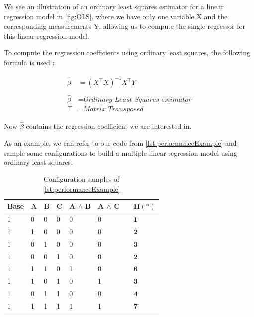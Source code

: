 We see an illustration of an ordinary least squares estimator for a linear regression model in \autoref{fig:OLS}, where we have only one variable 
X and the corresponding measurements Y, allowing us to compute the single regressor for this linear regression model.

To compute the regression coefficients using ordinary least squares, the following formula is used \cite{Linear-Regression}:

\begin{align}
    \hat{\beta} &=  (\textit{X}^{\top } \textit{X} )^{-1}\textit{X}^{\top} Y \\ \nonumber \\\nonumber
    \hat{\beta} &= \textit{Ordinary Least Squares estimator}\\\nonumber
    \top &= \textit{Matrix Transposed}\nonumber
\end{align}\label{equ:ols}

Now $\hat{\beta}$ contains the regression coefficient we are interested in.

As an example, we can refer to our code from \autoref{lst:performanceExample}
and sample some configurations to build a multiple linear regression model using ordinary least squares.

\begin{table}[H]
    \centering
    \begin{tabular}{llllllll}
    \hline
    Base & A & B & C & A $\land$ B & A $\land$ C &  & $\bm{\Pi(*)}$ \\ \hline
    1    & 0 & 0 & 0 & 0           & 0           &  &  $\mathbf{1}$   \\
    1    & 1 & 0 & 0 & 0           & 0           &  &  $\mathbf{2}$   \\
    1    & 0 & 1 & 0 & 0           & 0           &  &   $\mathbf{3}$  \\  
    1    & 0 & 0 & 1 & 0           & 0           &  &   $\mathbf{2}$  \\  
    1    & 1 & 1 & 0 & 1           & 0           &  &   $\mathbf{6}$   \\
    1    & 1 & 0 & 1 & 0           & 1           &  &   $\mathbf{3}$  \\  
    1    & 0 & 1 & 1 & 0           & 0           &  &   $\mathbf{4}$  \\  
    1    & 1 & 1 & 1 & 1           & 1           &  &   $\mathbf{7}$  \\ \hline

    \end{tabular}  
    \caption{Configuration samples of \autoref{lst:performanceExample}}
\end{table}

